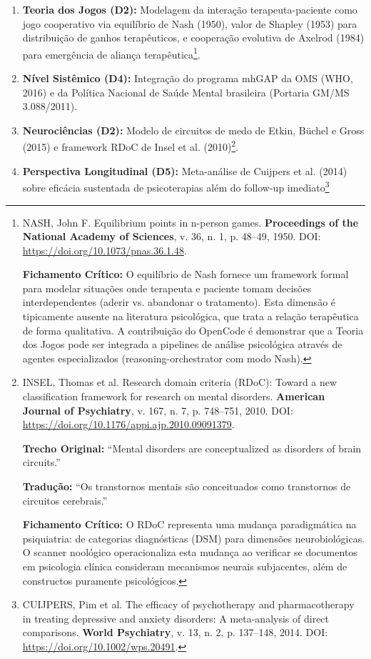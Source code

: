 \begin{enumerate}
  \item \textbf{Teoria dos Jogos (D2):} Modelagem da interação terapeuta-paciente como jogo cooperativo via equilíbrio de Nash (1950), valor de Shapley (1953) para distribuição de ganhos terapêuticos, e cooperação evolutiva de Axelrod (1984) para emergência de aliança terapêutica\footnote{
    NASH, John F. Equilibrium points in n-person games. \textbf{Proceedings of the National Academy of Sciences}, v. 36, n. 1, p. 48--49, 1950. DOI: \url{https://doi.org/10.1073/pnas.36.1.48}.

    \textbf{Fichamento Crítico:} O equilíbrio de Nash fornece um framework formal para modelar situações onde terapeuta e paciente tomam decisões interdependentes (aderir vs. abandonar o tratamento). Esta dimensão é tipicamente ausente na literatura psicológica, que trata a relação terapêutica de forma qualitativa. A contribuição do OpenCode é demonstrar que a Teoria dos Jogos pode ser integrada a pipelines de análise psicológica através de agentes especializados (reasoning-orchestrator com modo Nash).
  }.

  \item \textbf{Nível Sistêmico (D4):} Integração do programa mhGAP da OMS (WHO, 2016) e da Política Nacional de Saúde Mental brasileira (Portaria GM/MS 3.088/2011).
  
  \item \textbf{Neurociências (D2):} Modelo de circuitos de medo de Etkin, Büchel e Gross (2015) e framework RDoC de Insel et al. (2010)\footnote{
    INSEL, Thomas et al. Research domain criteria (RDoC): Toward a new classification framework for research on mental disorders. \textbf{American Journal of Psychiatry}, v. 167, n. 7, p. 748--751, 2010. DOI: \url{https://doi.org/10.1176/appi.ajp.2010.09091379}.

    \textbf{Trecho Original:} ``Mental disorders are conceptualized as disorders of brain circuits.''

    \textbf{Tradução:} ``Os transtornos mentais são conceituados como transtornos de circuitos cerebrais.''

    \textbf{Fichamento Crítico:} O RDoC representa uma mudança paradigmática na psiquiatria: de categorias diagnósticas (DSM) para dimensões neurobiológicas. O scanner noológico operacionaliza esta mudança ao verificar se documentos em psicologia clínica consideram mecanismos neurais subjacentes, além de constructos puramente psicológicos.
  }.

  \item \textbf{Perspectiva Longitudinal (D5):} Meta-análise de Cuijpers et al. (2014) sobre eficácia sustentada de psicoterapias além do follow-up imediato\footnote{
    CUIJPERS, Pim et al. The efficacy of psychotherapy and pharmacotherapy in treating depressive and anxiety disorders: A meta-analysis of direct comparisons. \textbf{World Psychiatry}, v. 13, n. 2, p. 137--148, 2014. DOI: \url{https://doi.org/10.1002/wps.20491}.

}
\end{enumerate}
